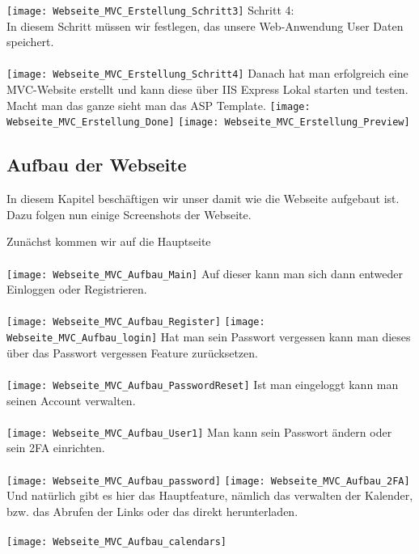 {\texttt{[image: Webseite\_MVC\_Erstellung\_Schritt3]}
Schritt 4:\\
In diesem Schritt müssen wir festlegen, das unsere Web-Anwendung User Daten speichert. \\ \\
\texttt{[image: Webseite\_MVC\_Erstellung\_Schritt4]}
Danach hat man erfolgreich eine MVC-Website erstellt und kann diese über IIS Express Lokal starten und testen. Macht man das ganze sieht man das ASP Template.
\texttt{[image: Webseite\_MVC\_Erstellung\_Done]}
\texttt{[image: Webseite\_MVC\_Erstellung\_Preview]}
\label{sec:erstellung}
\subsection{Aufbau der Webseite }
\label{sec:aufbau}
In diesem Kapitel beschäftigen wir unser damit wie die Webseite aufgebaut ist. Dazu folgen nun einige Screenshots der Webseite. 

Zunächst kommen wir auf die Hauptseite\\ \\
\texttt{[image: Webseite\_MVC\_Aufbau\_Main]}
Auf dieser kann man sich dann entweder Einloggen oder Registrieren. \\ \\
\texttt{[image: Webseite\_MVC\_Aufbau\_Register]}
\texttt{[image: Webseite\_MVC\_Aufbau\_login]}
Hat man sein Passwort vergessen kann man dieses über das Passwort vergessen Feature zurücksetzen. \\ \\
\texttt{[image: Webseite\_MVC\_Aufbau\_PasswordReset]}
Ist man eingeloggt kann man seinen Account verwalten.\\ \\
\texttt{[image: Webseite\_MVC\_Aufbau\_User1]}
Man kann sein Passwort ändern oder sein 2FA einrichten. \\ \\
\texttt{[image: Webseite\_MVC\_Aufbau\_password]}
\texttt{[image: Webseite\_MVC\_Aufbau\_2FA]}
Und natürlich gibt es hier das Hauptfeature, nämlich das verwalten der Kalender, bzw. das Abrufen der Links oder das direkt herunterladen.\\ \\
\texttt{[image: Webseite\_MVC\_Aufbau\_calendars]}
}
